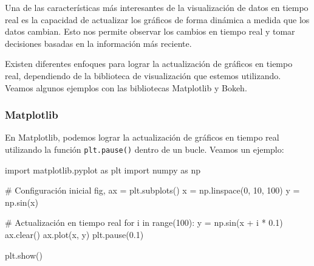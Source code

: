 \documentclass[
  a4paper,
]{article}
\newenvironment{Shaded}{}{}
\newcommand{\BuiltInTok}[1]{\textcolor[rgb]{0.84,0.23,0.29}{#1}}
\newcommand{\CommentTok}[1]{\textcolor[rgb]{0.42,0.45,0.49}{#1}}
\newcommand{\ControlFlowTok}[1]{\textcolor[rgb]{0.84,0.23,0.29}{#1}}
\newcommand{\DecValTok}[1]{\textcolor[rgb]{0.00,0.36,0.77}{#1}}
\newcommand{\FloatTok}[1]{\textcolor[rgb]{0.00,0.36,0.77}{#1}}
\newcommand{\ImportTok}[1]{\textcolor[rgb]{0.01,0.18,0.38}{#1}}
\newcommand{\KeywordTok}[1]{\textcolor[rgb]{0.84,0.23,0.29}{#1}}
\newcommand{\NormalTok}[1]{\textcolor[rgb]{0.14,0.16,0.18}{#1}}
\newcommand{\OperatorTok}[1]{\textcolor[rgb]{0.14,0.16,0.18}{#1}}
\begin{document}
Una de las características más interesantes de la visualización de datos
en tiempo real es la capacidad de actualizar los gráficos de forma
dinámica a medida que los datos cambian. Esto nos permite observar los
cambios en tiempo real y tomar decisiones basadas en la información más
reciente.

Existen diferentes enfoques para lograr la actualización de gráficos en
tiempo real, dependiendo de la biblioteca de visualización que estemos
utilizando. Veamos algunos ejemplos con las bibliotecas Matplotlib y
Bokeh.

\hypertarget{matplotlib}{%
\subsubsection{Matplotlib}\label{matplotlib}}

En Matplotlib, podemos lograr la actualización de gráficos en tiempo
real utilizando la función \texttt{plt.pause()} dentro de un bucle.
Veamos un ejemplo:

\begin{Shaded}
\begin{Highlighting}[]
\ImportTok{import}\NormalTok{ matplotlib.pyplot }\ImportTok{as}\NormalTok{ plt}
\ImportTok{import}\NormalTok{ numpy }\ImportTok{as}\NormalTok{ np}

\CommentTok{\# Configuración inicial}
\NormalTok{fig, ax }\OperatorTok{=}\NormalTok{ plt.subplots()}
\NormalTok{x }\OperatorTok{=}\NormalTok{ np.linspace(}\DecValTok{0}\NormalTok{, }\DecValTok{10}\NormalTok{, }\DecValTok{100}\NormalTok{)}
\NormalTok{y }\OperatorTok{=}\NormalTok{ np.sin(x)}

\CommentTok{\# Actualización en tiempo real}
\ControlFlowTok{for}\NormalTok{ i }\KeywordTok{in} \BuiltInTok{range}\NormalTok{(}\DecValTok{100}\NormalTok{):}
\NormalTok{    y }\OperatorTok{=}\NormalTok{ np.sin(x }\OperatorTok{+}\NormalTok{ i }\OperatorTok{*} \FloatTok{0.1}\NormalTok{)}
\NormalTok{    ax.clear()}
\NormalTok{    ax.plot(x, y)}
\NormalTok{    plt.pause(}\FloatTok{0.1}\NormalTok{)}

\NormalTok{plt.show()}
\end{Highlighting}
\end{Shaded}
\end{document}
